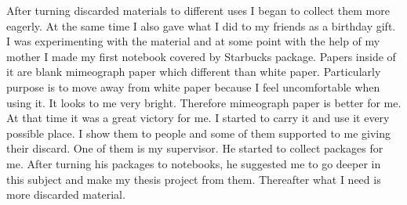 


After turning discarded materials to different uses I began to collect them more eagerly. At the same time I also gave what I did to my friends as a birthday gift. I was experimenting with the material and at some point with the help of my mother I made my first notebook covered by Starbucks package. Papers inside of it are blank mimeograph paper which different than white paper. Particularly purpose is to move away from white paper because I feel uncomfortable when using it. It looks to me very bright. Therefore mimeograph paper is better for me. At that time it was a great victory for me. I started to carry it and use it every possible place. I show them to people and some of them supported to me giving their discard. One of them is my supervisor. He started to collect packages for me. After turning his packages to notebooks, he suggested me to go deeper in this subject and make my thesis project from them. Thereafter what I need is more discarded material.



